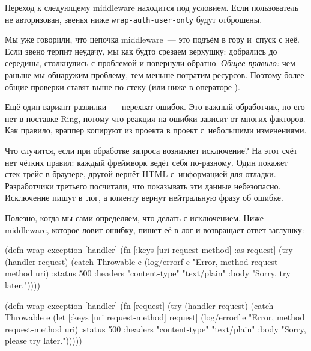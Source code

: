 \fi

Переход к следующему middleware находится под условием. Если пользователь не
авторизован, звенья ниже \texttt{wrap\--auth\--user\--only} будут отброшены.

Мы уже говорили, что цепочка middleware~--- это подъём в гору и~спуск с
неё. Если звено терпит неудачу, мы как будто срезаем верхушку: добрались до
середины, столкнулись с проблемой и повернули обратно. \emph{Общее правило:} чем
раньше мы обнаружим проблему, тем меньше потратим ресурсов. Поэтому более общие
проверки ставят выше по стеку (или ниже в операторе \arr).


Ещё один вариант развилки~--- перехват ошибок. Это важный обработчик, но его нет
в поставке Ring, потому что реакция на ошибки зависит от многих факторов. Как
правило, враппер копируют из проекта в проект с~небольшими изменениями.

Что случится, если при обработке запроса возникнет исключение? На этот счёт
нет чётких правил: каждый фреймворк ведёт себя по-разному. Один покажет
стек-трейс в браузере, другой вернёт HTML с~информацией для
отладки. Разработчики третьего посчитали, что показывать эти данные
небезопасно. Исключение пишут в~лог, а клиенту вернут нейтральную фразу об
ошибке.

Полезно, когда мы сами определяем, что делать с исключением. Ниже middleware,
которое ловит ошибку, пишет её в лог и возвращает ответ-заглушку:


\ifnarrow

\begin{english}
  \begin{clojure}
(defn wrap-exception [handler]
  (fn [{:keys [uri request-method]
        :as request}]
    (try
      (handler request)
      (catch Throwable e
        (log/errorf e
          "Error, method %
          request-method uri)
          {:status 500
           :headers
           {"content-type" "text/plain"}
           :body "Sorry, try later."}))))
  \end{clojure}
\end{english}

\else

\begin{english}
  \begin{clojure}
(defn wrap-exception [handler]
  (fn [request]
    (try
      (handler request)
      (catch Throwable e
        (let [{:keys [uri request-method]} request]
          (log/errorf e "Error, method %
                      request-method uri)
          {:status 500
           :headers {"content-type" "text/plain"}
           :body "Sorry, please try later."})))))
  \end{clojure}
\end{english}

